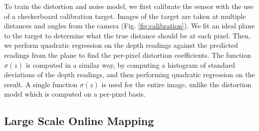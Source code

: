 \documentclass[10pt,twocolumn,letterpaper]{article}
\begin{document}
 To train the distortion and noise model, we first calibrate the sensor with the
 use of a checkerboard calibration target. Images of the target are taken at
 multiple distances and angles from the camera (Fig. \ref{fig:calibration}). We
 fit an ideal plane to the target to determine what the true distance should be
 at each pixel. Then, we perform quadratic regression on the depth readings
 against the predicted readings from the plane to find the per-pixel distortion
 coefficients. The function $\sigma(z)$ is computed in a similar way, by
 computing a histogram of standard deviations of the depth readings, and then
 performing quadratic regression on the result. A single function $\sigma(z)$ is used for the
 entire image, unlike the distortion model which is computed on a per-pixel
 basis.
 
\subsection{Large Scale Online Mapping}
\end{document}
